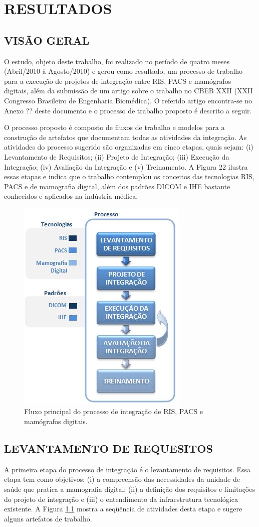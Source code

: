\chapter[RESULTADOS]{\textbf {RESULTADOS}}

\section[VISÃO GERAL]{VISÃO GERAL}
O estudo, objeto deste trabalho, foi realizado no período de quatro meses (Abril/2010 à
Agosto/2010) e gerou como resultado, um processo de trabalho para a execução de
projetos de integração entre RIS, PACS e mamógrafos digitais, além da submissão de um
artigo sobre o trabalho no CBEB XXII (XXII Congresso Brasileiro de Engenharia
Biomédica). O referido artigo encontra-se no Anexo ?? deste documento e o processo de
trabalho proposto é descrito a seguir.

O processo proposto é composto de fluxos de trabalho e modelos para a construção de
artefatos que documentam todas as atividades da integração. As atividades do processo
sugerido são organizadas em cinco etapas, quais sejam: (i) Levantamento de Requisitos;
(ii) Projeto de Integração; (iii) Execução da Integração; (iv) Avaliação da Integração e (v)
Treinamento. A Figura 22 ilustra essas etapas e indica que o trabalho contemplou os
conceitos das tecnologias RIS, PACS e de mamografia digital, além dos padrões DICOM e
IHE bastante conhecidos e aplicados na indústria médica.


\begin{figure}[ht]
 \centering
 \includegraphics[width=6 cm]{figuras/fig2}
 \caption{Fluxo principal do processo de integração de RIS, PACS e mamógrafos digitais.}
 \label{fig2}
\end{figure}


\section[LEVANTAMENTO DE REQUESITOS]{LEVANTAMENTO DE REQUESITOS}


A primeira etapa do processo de integração é o levantamento de requisitos. Essa etapa tem
como objetivos: (i) a compreensão das necessidades da unidade de saúde que pratica a
mamografia digital; (ii) a definição dos requisitos e limitações do projeto de integração e
(iii) o entendimento da infraestrutura tecnológica existente. A Figura \ref{fig2} mostra a
seqüência de atividades desta etapa e sugere alguns artefatos de trabalho.


